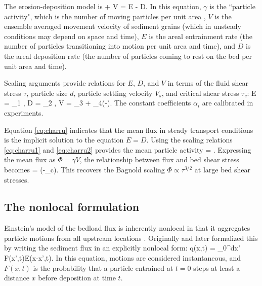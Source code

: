 The erosion-deposition model is
\be \pt \gamma +  \px V \gamma = E - D. \label{eq:charru}\ee
In this equation, $\gamma$ is the ``particle activity", which is the number of moving particles per unit area \citep{Furbish2012}, $V$ is the ensemble averaged movement velocity of sediment grains (which in unsteady conditions may depend on space and time), $E$ is the areal entrainment rate (the number of particles transitioning into motion per unit area and time), and $D$ is the areal deposition rate (the number of particles coming to rest on the bed per unit area and time).

Scaling arguments provide relations for $E$, $D$, and $V$ in terms of the fluid shear stress $\tau$, particle size $d$, particle settling velocity $V_s$, and critical shear stress $\tau_c$:
\be E = \alpha_1 , \label{eq:charru1}\ee
\be D  = \alpha_2 , \ee
\be V = \alpha_3 + \alpha_4(\sqrt{\tau}-). \label{eq:charru2}\ee
The constant coefficients $\alpha_i$ are calibrated in experiments.

Equation \ref{eq:charru} indicates that the mean flux in steady transport conditions is the implicit solution to the equation $E = D.$
Using the scaling relations \ref{eq:charru1} and \ref{eq:charru2} provides the mean particle activity
\be \gamma = .\ee
Expressing the mean flux as $\Phi = \gamma V$, the relationship between flux and bed shear stress becomes
\be \Phi = \big(\tau-\tau_c\big). \ee
This recovers the Bagnold scaling $\Phi \propto \tau^{3/2}$ at large bed shear stresses.

\subsection{The nonlocal formulation}
\label{sec:nonlocal}

Einstein's model of the bedload flux is inherently nonlocal in that it aggregates particle motions from all upstream locations \citep{Schumer2009,Tucker2010a,Martin2012}. 
Originally \citet{Nakagawa1976} and later \citet{Parker2000} formalized this by writing the sediment flux in an explicitly nonlocal form:
\be q(x,t) = \int_0^\infty dx' F(x',t)E(x-x',t). \ee
In this equation, motions are considered instantaneous, and $F(x,t)$ is the probability that a particle entrained at $t=0$ steps at least a distance $x$ before deposition at time $t$.

